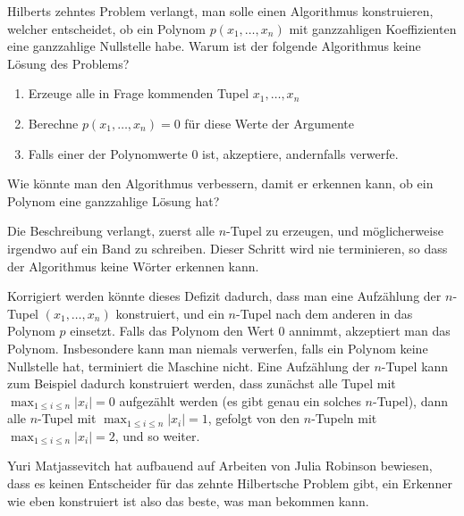 Hilberts zehntes Problem verlangt, man solle einen Algorithmus
konstruieren, welcher entscheidet, ob ein Polynom $p(x_1,\dots,x_n)$
mit ganzzahligen
Koeffizienten eine ganzzahlige Nullstelle habe. Warum ist der folgende
Algorithmus keine Lösung des Problems?
\begin{enumerate}
\item Erzeuge alle in Frage kommenden Tupel $x_1,\dots,x_n$
\item Berechne $p(x_1,\dots,x_n)=0$ für diese Werte der Argumente
\item Falls einer der Polynomwerte $0$ ist, akzeptiere, andernfalls
verwerfe.
\end{enumerate}
Wie könnte man den Algorithmus verbessern, damit er erkennen kann,
ob ein Polynom eine ganzzahlige Lösung hat?

\begin{loesung}
Die Beschreibung verlangt, zuerst alle $n$-Tupel zu erzeugen,
und möglicherweise irgendwo auf ein Band zu schreiben. Dieser
Schritt wird nie terminieren, so dass der Algorithmus keine
Wörter erkennen kann.

Korrigiert werden könnte dieses Defizit dadurch, dass man eine
Aufzählung der $n$-Tupel $(x_1,\dots,x_n)$ konstruiert, und ein
$n$-Tupel nach dem anderen in das Polynom $p$
einsetzt. Falls das Polynom den Wert $0$ annimmt, akzeptiert man
das Polynom. Insbesondere kann man niemals verwerfen, falls
ein Polynom keine Nullstelle hat, terminiert die Maschine nicht.
Eine Aufzählung der $n$-Tupel kann zum Beispiel dadurch konstruiert
werden, dass zunächst alle Tupel mit
$\max_{1\le i\le n}|x_i|=0$
aufgezählt werden (es gibt genau ein solches $n$-Tupel),
dann alle $n$-Tupel mit
$\max_{1\le i\le n}|x_i|=1$,
gefolgt von den $n$-Tupeln mit
$\max_{1\le i\le n}|x_i|=2$, und so weiter.

Yuri Matjassevitch hat aufbauend auf Arbeiten von Julia Robinson bewiesen,
dass es
keinen Entscheider für das zehnte Hilbertsche Problem gibt,
ein Erkenner wie eben konstruiert ist also das beste, was
man bekommen kann.
\end{loesung}
